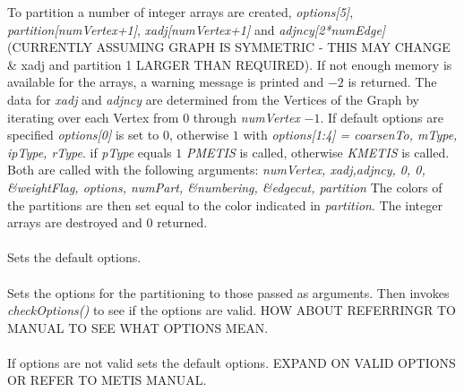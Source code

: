 To partition a number of integer arrays are created, {\em options[5]},
{\em partition[numVertex+1]}, {\em xadj[numVertex+1]} and {\em
adjncy[2*numEdge]} (CURRENTLY ASSUMING GRAPH IS SYMMETRIC - THIS MAY
CHANGE \& xadj and partition 1 LARGER THAN REQUIRED). If not enough
memory is available for the arrays, a warning message is printed and
$-2$ is returned. The data for {\em xadj} and {\em adjncy} are
determined from the Vertices of the Graph by iterating over each
Vertex from $0$ through {\em numVertex} $-1$. If default options are
specified {\em options[0]} is set to $0$, otherwise $1$ with {\em
options[1:4] = coarsenTo, mType, ipType, rType}. if {\em pType} equals
$1$ {\em PMETIS} is called, otherwise {\em KMETIS} is called. Both are
called with the following arguments: {\em numVertex, xadj,adjncy, 0,
0, \&weightFlag, options, numPart, \&numbering, \&edgecut, partition} 
The colors of the partitions are then set equal to the color indicated
in {\em partition}.  The integer arrays are destroyed and $0$
returned. \\

\\
Sets the default options. \\

  \\ 
Sets the options for the partitioning to those passed as
arguments. Then invokes {\em checkOptions()} to see if the options are
valid. HOW ABOUT REFERRINGR TO MANUAL TO SEE WHAT OPTIONS MEAN. \\

  \\
If options are not valid sets the default options. EXPAND ON VALID
OPTIONS OR REFER TO METIS MANUAL. \\
